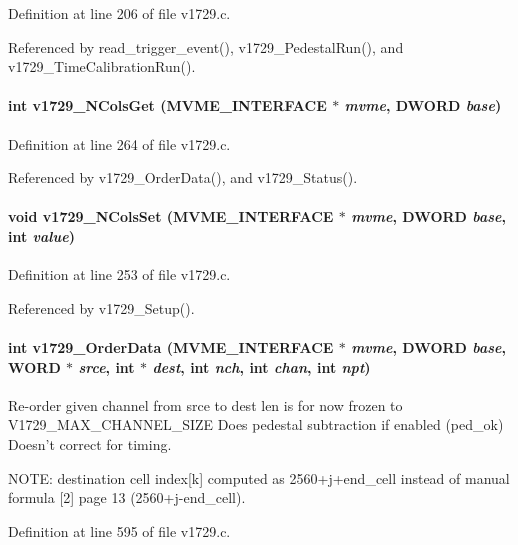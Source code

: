 Definition at line 206 of file v1729.c.

Referenced by read\_\-trigger\_\-event(), v1729\_\-PedestalRun(), and v1729\_\-TimeCalibrationRun().
\paragraph[{v1729\_\-NColsGet}]{\setlength{\rightskip}{0pt plus 5cm}int v1729\_\-NColsGet ({\bf MVME\_\-INTERFACE} $\ast$ {\em mvme}, \/  {\bf DWORD} {\em base})}\hfill\label{v1729_8c_a48a3befe95ef335d93f58dfd4d90326b}


Definition at line 264 of file v1729.c.

Referenced by v1729\_\-OrderData(), and v1729\_\-Status().
\paragraph[{v1729\_\-NColsSet}]{\setlength{\rightskip}{0pt plus 5cm}void v1729\_\-NColsSet ({\bf MVME\_\-INTERFACE} $\ast$ {\em mvme}, \/  {\bf DWORD} {\em base}, \/  int {\em value})}\hfill\label{v1729_8c_a4ab00eb7decf0235dec7f0918ae1d820}


Definition at line 253 of file v1729.c.

Referenced by v1729\_\-Setup().
\paragraph[{v1729\_\-OrderData}]{\setlength{\rightskip}{0pt plus 5cm}int v1729\_\-OrderData ({\bf MVME\_\-INTERFACE} $\ast$ {\em mvme}, \/  {\bf DWORD} {\em base}, \/  {\bf WORD} $\ast$ {\em srce}, \/  int $\ast$ {\em dest}, \/  int {\em nch}, \/  int {\em chan}, \/  int {\em npt})}\hfill\label{v1729_8c_a16527915223d5ba500133a7773990d57}
Re-\/order given channel from srce to dest len is for now frozen to V1729\_\-MAX\_\-CHANNEL\_\-SIZE Does pedestal subtraction if enabled (ped\_\-ok) Doesn't correct for timing.

NOTE: destination cell index\mbox{[}k\mbox{]} computed as 2560+j+end\_\-cell instead of manual formula \mbox{[}2\mbox{]} page 13 (2560+j-\/end\_\-cell). 

Definition at line 595 of file v1729.c.

